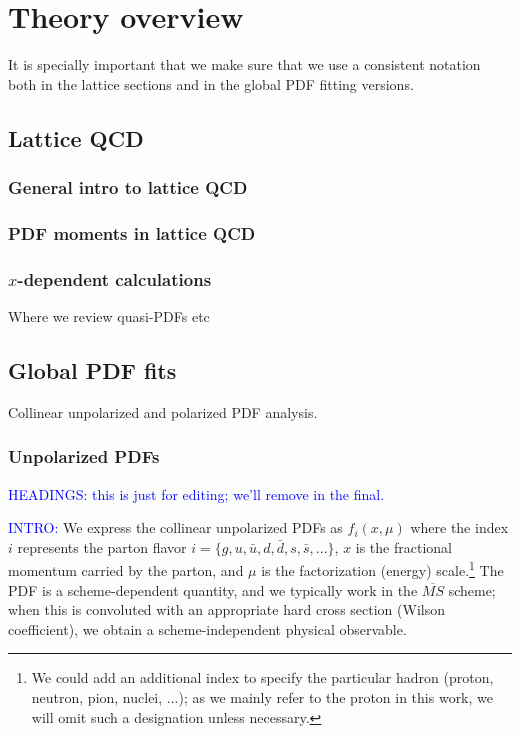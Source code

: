 
\section{Theory overview}
\label{sec:theoryoverview}

It is specially important that we make sure that we use a consistent
notation both in the lattice sections and in the global
PDF fitting versions.

\subsection{Lattice QCD}


\subsubsection{General intro to lattice QCD}


\subsubsection{PDF moments in lattice QCD}


\subsubsection{$x$-dependent calculations}

Where we review quasi-PDFs etc



\subsection{Global PDF fits}

Collinear unpolarized and polarized PDF analysis.

\subsubsection{Unpolarized PDFs}




\textcolor{blue}{HEADINGS: this is just for editing; we'll remove in the final. }

\textcolor{blue}{INTRO:} 
We express the collinear unpolarized PDFs as $f_{i}(x,\mu)$
where the index $i$ represents the parton flavor $i=\{g,u,\bar{u},d,\bar{d},s,\bar{s},...\}$,
$x$ is the fractional momentum carried by the parton, and $\mu$
is the factorization (energy) scale.\footnote{We could add an additional index to specify the particular hadron
(proton, neutron, pion, nuclei, ...); as we mainly refer to the proton
in this work, we will omit such a designation unless necessary.} The PDF is a scheme-dependent quantity, and we typically work in
the $\overline{MS}$ scheme; when this is convoluted with an appropriate
hard cross section (Wilson coefficient), we obtain a scheme-independent
physical observable. 

